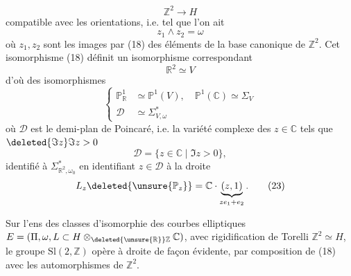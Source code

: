 \[
 \mathbb Z^2\longrightarrow H \tag*{(18)}
\]
compatible avec les orientations, i.e. tel que l'on ait
\[
 z_1\wedge z_2=\omega \tag*{(19)}
\]
où $z_1,z_2$ sont les images par (18) des éléments de la base canonique de $\mathbb Z^2$. Cet isomorphisme (18) définit un isomorphisme correspondant
\[
 \mathbb R^2\simeq V \tag*{(20)}
\]
d'où des isomorphismes
\[
 \left\{\begin{aligned}
 \mathbb P^1_{\mathbb R}&\simeq\mathbb P^1(V),\quad\mathbb P^1(\mathbb C)\simeq\Sigma_V\\
 \mathscr D&\simeq\Sigma_{V,\omega}^*
 \end{aligned}\right. \tag*{(21)}
\]
où $\mathscr D$ est le demi-plan de Poincaré, i.e.  la variété complexe des $z\in\mathbb C$ tels que $\deleted{\Im z}\Im z>0$
\[
 \mathscr D=\{z\in\mathbb C\mid\Im z>0\}, \tag*{(22)}
\]
identifié à $\Sigma_{\mathbb R^2,\omega_0}^*$ en identifiant $z\in\mathscr D$ à la droite
\[
 L_z\deleted{\unsure{\mathbb P_z}}=\mathbb C\cdot\underbrace{(z,1)}_{ze_1+e_2}. \tag*{(23)}
\]

Sur l'ens des classes d'isomorphie des courbes elliptiques $E=(\Pi,\omega,L\subset H\otimes_{\deleted{\unsure{\mathbb R}}\mathbb Z}\mathbb C)$, avec rigidification de Torelli $\mathbb Z^2\simeq H$, le groupe $\mathrm{Sl}(2,\mathbb Z)$ opère à droite de façon évidente, par composition  de (18) avec les automorphismes de $\mathbb Z^2$. 
